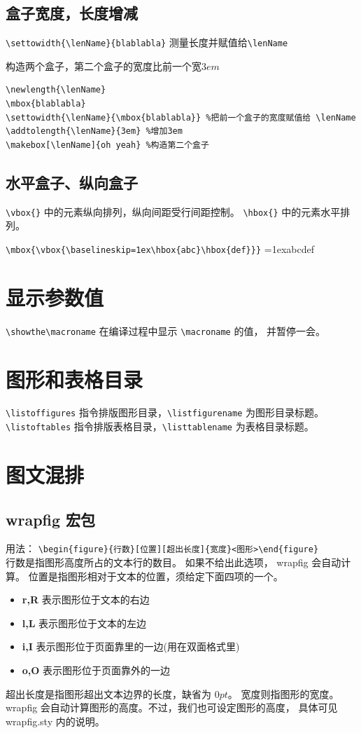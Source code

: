 \documentclass[a4paper,11pt]{article}
\begin{document}
\subsection{盒子宽度，长度增减}
\verb+\settowidth{\lenName}{blablabla}+ 测量长度并赋值给\verb+\lenName+

构造两个盒子，第二个盒子的宽度比前一个宽$3em$
\begin{Verbatim}
\newlength{\lenName}
\mbox{blablabla}
\settowidth{\lenName}{\mbox{blablabla}} %把前一个盒子的宽度赋值给 \lenName
\addtolength{\lenName}{3em} %增加3em
\makebox[\lenName]{oh yeah} %构造第二个盒子
\end{Verbatim}

\subsection{水平盒子、纵向盒子}
\verb+\vbox{}+ 中的元素纵向排列，纵向间距受行间距控制。
\verb+\hbox{}+ 中的元素水平排列。

\verb+\mbox{\vbox{\baselineskip=1ex\hbox{abc}\hbox{def}}}+\hspace{2em}
\mbox{\vbox{\baselineskip=1ex\hbox{abc}\hbox{def}}}

\section{显示参数值}
\verb+\showthe\macroname+ 在编译过程中显示 \verb+\macroname+ 的值，
并暂停一会。


\section{图形和表格目录}
\verb+\listoffigures+ 指令排版图形目录，\verb+\listfigurename+
为图形目录标题。\\
\verb+\listoftables+ 指令排版表格目录，\verb+\listtablename+
为表格目录标题。

\section{图文混排}
\subsection{wrapfig 宏包}
用法：%
\verb+\begin{figure}{行数}[位置][超出长度]{宽度}<图形>\end{figure}+\\
行数是指图形高度所占的文本行的数目。 如果不给出此选项，
wrapfig 会自动计算。 位置是指图形相对于文本的位置，须给定下面四项的一个。
\begin{itemize}
	\item {\bf r,R} 表示图形位于文本的右边
	\item {\bf l,L} 表示图形位于文本的左边
	\item {\bf i,I} 表示图形位于页面靠里的一边(用在双面格式里)
	\item {\bf o,O} 表示图形位于页面靠外的一边
\end{itemize}
超出长度是指图形超出文本边界的长度，缺省为 $0pt$。 宽度则指图形的宽度。
wrapfig 会自动计算图形的高度。不过，我们也可设定图形的高度，
具体可见 wrapfig.sty 内的说明。
\end{document}
